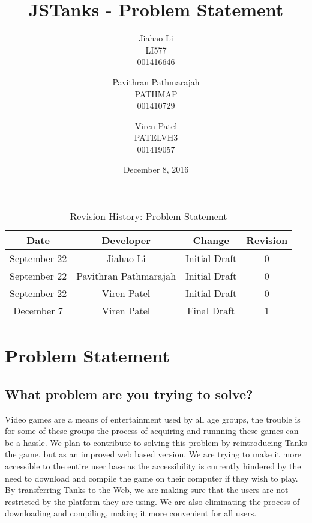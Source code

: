 \documentclass{article}
\begin{document}
\newpage
\title{JSTanks - Problem Statement}
\date{December 8, 2016}
\author{Jiahao Li\\LI577\\001416646\and Pavithran Pathmarajah\\PATHMAP\\
001410729 \and Viren Patel\\PATELVH3\\001419057}

\maketitle

\newpage
{}



\begin{table}[h!]
  \centering
  \caption{Revision History: Problem Statement}
  \label{tab:table1}
  \begin{tabular}{cccc}
	\toprule
	Date &  Developer & Change & Revision\\
	\midrule
	September 22&Jiahao Li &Initial Draft &0\\
	September 22&Pavithran Pathmarajah &Initial Draft &0\\
	September 22&Viren Patel  &Initial Draft &0\\
	December 7&Viren Patel &Final Draft&1\\
	\bottomrule
  \end{tabular}
\end{table}

\newpage

\section*{Problem Statement}

\subsection{What problem are you trying to solve?}
Video games are a means of entertainment used by all age groups, the trouble is for some of these groups the process of acquiring and runnning these games can be a hassle. We plan to contribute to solving this problem by reintroducing Tanks the game, but as an improved web based version. We are trying to make it more accessible to the entire user base as the accessibility is currently hindered by the need to download and compile the game on their computer if they wish to play. By transferring Tanks to the Web, we are making sure that the users are not restricted by the platform they are using. We are also eliminating the process of downloading and compiling, making it more convenient for all users. 
\end{document}

